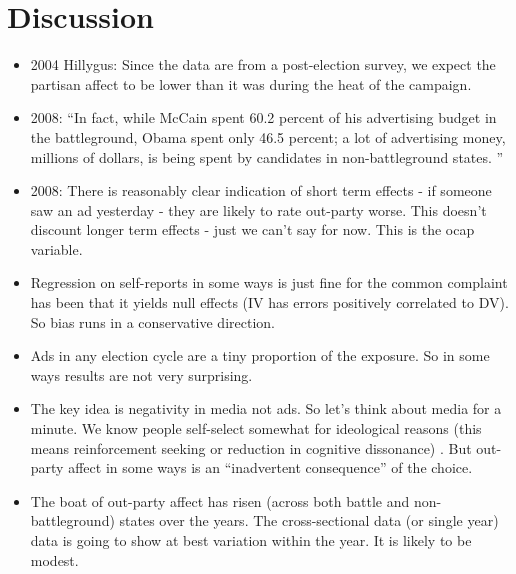 \documentclass[doc,fignum,noapacite]{apa}
\begin{document}
\section{Discussion}
\begin{itemize}
\item 2004 Hillygus: Since the data are from a post-election survey, we expect the partisan affect to be lower than 
it was during the heat of the campaign.
\item 2008: ``In fact, while McCain spent 60.2 percent of his advertising budget in the 
battleground, Obama spent only 46.5 percent; a lot of advertising money, millions of dollars, is being spent
by candidates in non-battleground states. '' \cite {Jackman2009b}
\item 2008: There is reasonably clear indication of short term effects - if someone saw an ad yesterday - they are 
likely to rate out-party worse. This doesn't discount longer term effects - just we can't say for now. This is the 
ocap variable.
\item Regression on self-reports in some ways is just fine for the common complaint has been that it yields null 
effects (IV has errors positively correlated to DV). So bias runs in a conservative direction.
\item Ads in any election cycle are a tiny proportion of the exposure. So in some ways results are not very surprising.
\item The key idea is negativity in media not ads. So let's think about media for a minute. We know people self-select 
somewhat for ideological reasons (this means reinforcement seeking or reduction in cognitive dissonance) .
But out-party affect in some ways is an ``inadvertent consequence'' of the choice. 
\item The boat of out-party affect has risen (across both battle and non-battleground) states over the years. 
The cross-sectional data (or single year) data is going to show at best variation within the year. It is likely to be 
modest. 
\end{itemize}
\newpage

 
\end{document}
